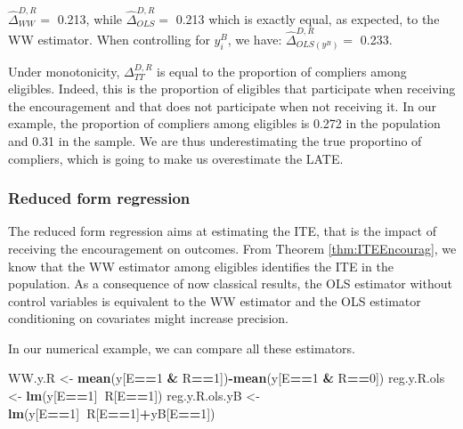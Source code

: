 \documentclass[]{book}
\newenvironment{Shaded}{\begin{snugshade}}{\end{snugshade}}
\newcommand{\DecValTok}[1]{\textcolor[rgb]{0.00,0.00,0.81}{#1}}
\newcommand{\KeywordTok}[1]{\textcolor[rgb]{0.13,0.29,0.53}{\textbf{#1}}}
\newcommand{\NormalTok}[1]{#1}
\newcommand{\OperatorTok}[1]{\textcolor[rgb]{0.81,0.36,0.00}{\textbf{#1}}}
\newcommand{\StringTok}[1]{\textcolor[rgb]{0.31,0.60,0.02}{#1}}
\theoremstyle{definition}
\theoremstyle{definition}
\theoremstyle{definition}
\theoremstyle{remark}
\let\BeginKnitrBlock\begin \let\EndKnitrBlock\end
\begin{document}
\(\hat{\Delta}^{D,R}_{WW} =\) 0.213, while \(\hat{\Delta}^{D,R}_{OLS}=\) 0.213 which is exactly equal, as expected, to the WW estimator.
When controlling for \(y^B_i\), we have: \(\hat{\Delta}^{D,R}_{OLS(y^B)}=\) 0.233.

Under monotonicity, \(\Delta^{D,R}_{TT}\) is equal to the proportion of compliers among eligibles.
Indeed, this is the proportion of eligibles that participate when receiving the encouragement and that does not participate when not receiving it.
In our example, the proportion of compliers among eligibles is 0.272 in the population and 0.31 in the sample.
We are thus underestimating the true proportino of compliers, which is going to make us overestimate the LATE.

\hypertarget{reduced-form-regression}{%
\subsubsection{Reduced form regression}\label{reduced-form-regression}}

The reduced form regression aims at estimating the ITE, that is the impact of receiving the encouragement on outcomes.
From Theorem \ref{thm:ITEEncourag}, we know that the WW estimator among eligibles identifies the ITE in the population.
As a consequence of now classical results, the OLS estimator without control variables is equivalent to the WW estimator and the OLS estimator conditioning on covariates might increase precision.

\BeginKnitrBlock{example}
\protect\hypertarget{exm:unnamed-chunk-120}{}{\label{exm:unnamed-chunk-120} }In our numerical example, we can compare all these estimators.
\EndKnitrBlock{example}

\begin{Shaded}
\begin{Highlighting}[]
\NormalTok{WW.y.R <-}\StringTok{ }\KeywordTok{mean}\NormalTok{(y[E}\OperatorTok{==}\DecValTok{1} \OperatorTok{&}\StringTok{ }\NormalTok{R}\OperatorTok{==}\DecValTok{1}\NormalTok{])}\OperatorTok{-}\KeywordTok{mean}\NormalTok{(y[E}\OperatorTok{==}\DecValTok{1} \OperatorTok{&}\StringTok{ }\NormalTok{R}\OperatorTok{==}\DecValTok{0}\NormalTok{])}
\NormalTok{reg.y.R.ols <-}\StringTok{ }\KeywordTok{lm}\NormalTok{(y[E}\OperatorTok{==}\DecValTok{1}\NormalTok{]}\OperatorTok{~}\NormalTok{R[E}\OperatorTok{==}\DecValTok{1}\NormalTok{])}
\NormalTok{reg.y.R.ols.yB <-}\StringTok{ }\KeywordTok{lm}\NormalTok{(y[E}\OperatorTok{==}\DecValTok{1}\NormalTok{]}\OperatorTok{~}\NormalTok{R[E}\OperatorTok{==}\DecValTok{1}\NormalTok{]}\OperatorTok{+}\NormalTok{yB[E}\OperatorTok{==}\DecValTok{1}\NormalTok{])}
\end{Highlighting}
\end{Shaded}
\end{document}
